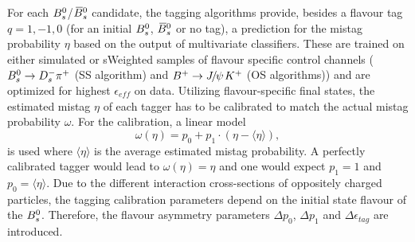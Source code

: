 For each ${{B}^0_{s}}$/${{\kern 0.18em\overline{\kern -0.18em B}{}}{}^0_{s}}$ candidate, the tagging algorithms provide, besides 
a flavour tag $q=1,-1,0$ (for an initial ${{B}^0_{s}}$, ${{\kern 0.18em\overline{\kern -0.18em B}{}}{}^0_{s}}$ or no tag), 
a prediction for the mistag probability $\eta$ 
based on the output of multivariate classifiers.
These are trained on either simulated or \textsf{sWeighted} samples of flavour specific control channels (${{B}^0_{s}}\rightarrow{\ensuremath{{D}^-_{s}}}{\ensuremath{{\pi}^+}}$ (SS algorithm) and ${{B}^+}\rightarrow{\ensuremath{{J\mskip -3mu/\mskip -2mu\psi\mskip 2mu}}}{\ensuremath{{K}^+}}$ (OS algorithms))
and are optimized for highest $\epsilon_{eff}$ on data.
Utilizing flavour-specific final states, the estimated mistag $\eta$ of each tagger has to be calibrated to match the actual mistag probability $\omega$. 
For the calibration, a linear model
\begin{equation}
\label{eq: mistagCalibration}
\omega(\eta) = p_{0} + p_{1} \cdot (\eta - \langle \eta \rangle), 
\end{equation}  
is used where $\langle \eta \rangle$ is the average estimated mistag probability.
A perfectly calibrated tagger would lead to $\omega(\eta) = \eta$ and one would expect $p_{1} = 1$ and $p_{0} = \langle \eta \rangle$.
Due to the different interaction cross-sections of oppositely charged particles, the tagging calibration parameters depend on the initial state flavour of the ${{B}^0_{s}}$. 
Therefore, the flavour asymmetry parameters $\Delta p_{0}$, $\Delta p_{1}$ and $\Delta\epsilon_{tag}$ are introduced. 



